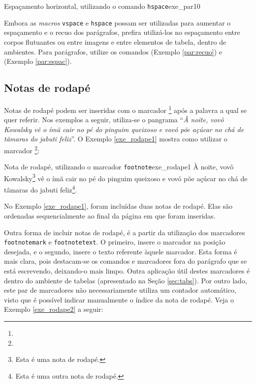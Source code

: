 \begin{texexptitled}[breakable,enhanced,middle=2mm]{Espaçamento horizontal, utilizando o comando {\tt hspace}}{exe_par10}
\hspace{2cm}\lipsumsentence[9-10] \\ 
\lipsumsentence[11-12]
\end{texexptitled}

Embora as \textit{macros} {\tt vspace} e {\tt hspace} possam ser utilizadas para aumentar o espaçamento e o recuo dos parágrafos, prefira utilizá-los no espaçamento entre corpos flutuantes ou entre imagens e entre elementos de tabela, dentro de ambientes. Para parágrafos, utilize os comandos \texttt{\parskip} (Exemplo \ref{par:recuo}) e \texttt{\parindent} (Exemplo \ref{par:espac}).

\subsection{Notas de rodapé}
\label{sec:notas_rodape}

Notas de rodapé podem ser inseridas com o marcador \texttt{\footnote{}} após a palavra a qual se quer referir. Nos exemplos a seguir, utiliza-se o pangrama\footnotemark{} ``\textit{À noite, vovô Kowalsky vê o ímã cair no pé do pinguim queixoso e vovó põe açúcar no chá de tâmaras do jabuti feliz\footnotemark{}}''. O Exemplo \ref{exe_rodape1} mostra como utilizar o marcador \texttt{\footnote{}}:

\begin{texexptitled}[breakable,enhanced,middle=2mm]{Nota de rodapé, utilizando o marcador {\tt footnote}}{exe_rodape1}
À noite, vovô Kowalsky\footnote{Esta é uma nota de rodapé.} vê o ímã cair no pé do pinguim queixoso e vovó põe açúcar no chá de tâmaras do jabuti feliz\footnote{Esta é uma outra nota de rodapé.}.
\end{texexptitled}

\addtocounter{footnote}{-2}

No Exemplo \ref{exe_rodape1}, foram incluídas duas notas de rodapé. Elas são ordenadas sequencialmente ao final da página em que foram inseridas.

Outra forma de incluir notas de rodapé, é a partir da utilização dos marcadores {\tt footnotemark} e {\tt footnotetext}. O primeiro, insere o marcador na posição desejada, e o segundo, insere o texto referente àquele marcador. Esta forma é mais clara, pois destacam-se os comandos e marcadores fora do parágrafo que se está escrevendo, deixando-o mais limpo. Outra aplicação útil destes marcadores é dentro do ambiente de tabelas (apresentado na Seção \ref{sec:tabs}). Por outro lado, este par de marcadores não necessariamente utiliza um contador automático, visto que é possível indicar manualmente o índice da nota de rodapé. Veja o Exemplo \ref{exe_rodape2} a seguir:

